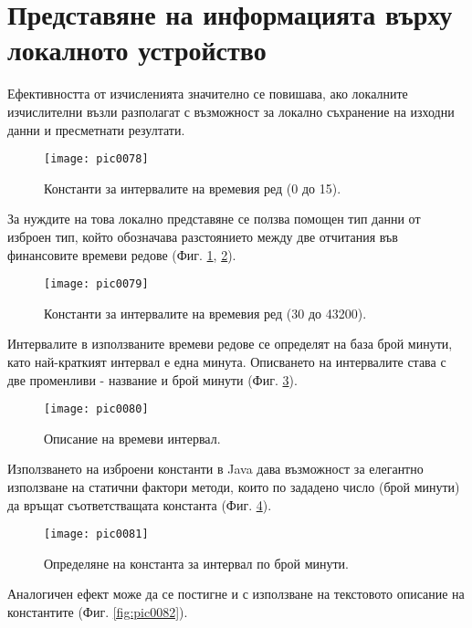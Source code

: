 \section{Представяне на информацията върху локалното устройство}

Ефективността от изчисленията значително се повишава, ако локалните изчислителни възли разполагат с възможност за локално съхранение на изходни данни и пресметнати резултати. 

\begin{figure}[h]
  \centering
  \texttt{[image: pic0078]}
  \caption{Константи за интервалите на времевия ред (0 до 15).}
\label{fig:pic0078}
\end{figure}
\FloatBarrier

За нуждите на това локално представяне се ползва помощен тип данни от изброен тип, който обозначава разстоянието между две отчитания във финансовите времеви редове (Фиг. \ref{fig:pic0078}, \ref{fig:pic0079}).

\begin{figure}[h]
  \centering
  \texttt{[image: pic0079]}
  \caption{Константи за интервалите на времевия ред (30 до 43200).}
\label{fig:pic0079}
\end{figure}
\FloatBarrier

Интервалите в използваните времеви редове се определят на база брой минути, като най-краткият интервал е една минута. Описването на интервалите става с две променливи - название и брой минути (Фиг. \ref{fig:pic0080}).

\begin{figure}[h]
  \centering
  \texttt{[image: pic0080]}
  \caption{Описание на времеви интервал.}
\label{fig:pic0080}
\end{figure}
\FloatBarrier

Използването на изброени константи в Java дава възможност за елегантно използване на статични фактори методи, които по зададено число (брой минути) да връщат съответстващата константа (Фиг. \ref{fig:pic0081}).

\begin{figure}[h]
  \centering
  \texttt{[image: pic0081]}
  \caption{Определяне на константа за интервал по брой минути.}
\label{fig:pic0081}
\end{figure}
\FloatBarrier

Аналогичен ефект може да се постигне и с използване на текстовото описание на константите (Фиг. \ref{fig:pic0082}).


